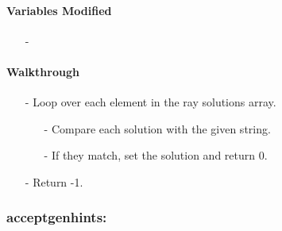 \documentclass[letterpaper,12pt]{article}
\begin{document}
\paragraph{Variables Modified}
\begin{enumerate}[leftmargin=10pt, noitemsep, parsep=0pt, topsep=0ex]
\item[-] 
\end{enumerate}

\paragraph{Walkthrough}
\begin{enumerate}[leftmargin=10pt, noitemsep, parsep=0pt, topsep=0ex]
\item[-] Loop over each element in the ray solutions array.
\begin{enumerate}[leftmargin=10pt, noitemsep, parsep=0pt, topsep=0ex]
\item[-] Compare each solution with the given string.
\item[-] If they match, set the solution and return 0.
\end{enumerate}
\item[-] Return -1.
\end{enumerate}

\subsubsection{acceptgenhints:}
\end{document}
